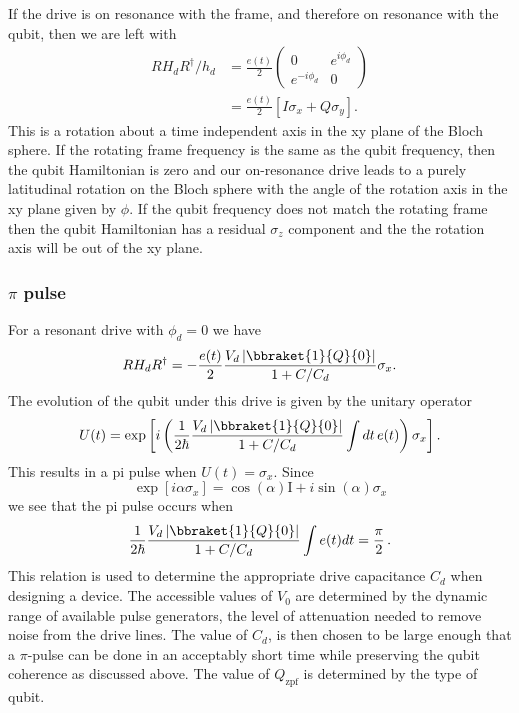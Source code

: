 If the drive is on resonance with the frame, and therefore on resonance with the qubit, then we are left with
\begin{align}
RH_dR^{\dagger}/h_d
&= \frac{e(t)}{2}\left( \begin{array}{cc} 0 & e^{i\phi_d} \\ e^{-i\phi_d} & 0 \end{array}\right) \\
&= \frac{e(t)}{2} \left[ I \sigma_x + Q \sigma_y \right] .
\end{align}
This is a rotation about a time independent axis in the xy plane of the Bloch sphere.
If the rotating frame frequency is the same as the qubit frequency, then the qubit Hamiltonian is zero and our on-resonance drive leads to a purely latitudinal rotation on the Bloch sphere with the angle of the rotation axis in the xy plane given by $\phi$.
If the qubit frequency does not match the rotating frame then the qubit Hamiltonian has a residual $\sigma_z$ component and the the rotation axis will be out of the xy plane.

\subsubsection{$\pi$ pulse}

For a resonant drive with $\phi_d=0$ we have \begin{equation}
RH_dR^{\dagger} = -\frac{e(t)}{2}\frac{V_d \left| \bbraket{1}{Q}{0} \right|} {1 + C/C_d} \sigma_x. \end{equation}
The evolution of the qubit under this drive is given by the unitary operator \begin{equation}
U(t) = \exp \left[ i \left( \frac{1}{2 \hbar} \frac{V_d \left| \bbraket{1}{Q}{0} \right|} {1 + C/C_d} \int dt \, e(t) \right) \sigma_x \right]. \end{equation}
This results in a pi pulse when $U(t)=\sigma_x$. Since \begin{equation}
\exp \left[ i \alpha \sigma_x \right] = \cos(\alpha)\textrm{I} + i \sin(\alpha)\sigma_x \end{equation}
we see that the pi pulse occurs when \begin{equation}
\frac{1}{2\hbar} \frac{V_d \left| \bbraket{1}{Q}{0} \right|} {1 + C/C_d} \int e(t) dt = \frac{\pi}{2} \, . \end{equation}
This relation is used to determine the appropriate drive capacitance $C_d$ when designing a device.
The accessible values of $V_0$ are determined by the dynamic range of available pulse generators, the level of attenuation needed to remove noise from the drive lines.
The value of $C_d$, is then chosen to be large enough that a $\pi$-pulse can be done in an acceptably short time while preserving the qubit coherence as discussed above.
The value of $Q_{\textrm{zpf}}$ is determined by the type of qubit.


